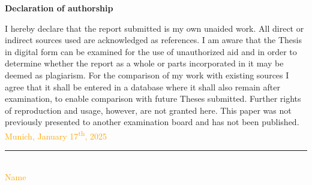 \documentclass[12pt]{article}
\begin{document}
	
	\Large
	\noindent
	\textbf{Declaration of authorship} 
	\vspace{0.5cm}
	\noindent
	\normalsize
	
	I hereby declare that the report submitted is my own unaided work. All direct 
	or indirect sources used are acknowledged as references. I am aware that the 
	Thesis in digital form can be examined for the use of unauthorized aid and in 
	order to determine whether the report as a whole or parts incorporated in it may 
	be deemed as plagiarism. For the comparison of my work with existing sources I 
	agree that it shall be entered in a database where it shall also remain after 
	examination, to enable comparison with future Theses submitted. Further rights 
	of reproduction and usage, however, are not granted here. This paper was not 
	previously presented to another examination board and has not been published.
	\\
	
	\vspace{1cm}
	\textcolor{orange}{Munich, January 17\textsuperscript{th}, 2025 } \\
	
	\vspace{3cm}
	
	\noindent\rule{0.5\textwidth}{0.4pt} \\
	
	\textcolor{orange}{Name}
	
	
\end{document}
